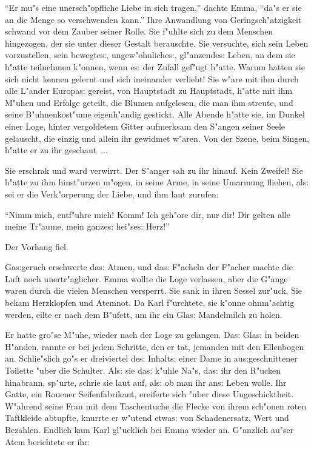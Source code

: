 \documentclass[oneside,12pt]{book}
\newcommand{\s}{s:}%
\begin{document}
"`Er mu"s eine unersch"opfliche Liebe in sich tragen,"' dachte
Emma, "`da"s er sie an die Menge so verschwenden kann."' Ihre
Anwandlung von Gering\-sch"atzigkeit schwand vor dem Zauber seiner
Rolle. Sie f"uhlte sich zu dem Menschen hingezogen, der sie unter
dieser Gestalt berauschte. Sie versuchte, sich sein Leben
vorzustellen, sein bewegte{\s}, ungew"ohnliche{\s}, gl"anzende{\s}
Leben, an dem sie h"atte teilnehmen k"onnen, wenn e{\s} der Zufall
gef"ugt h"atte. Warum hatten sie sich nicht kennen gelernt und
sich ineinander verliebt! Sie w"are mit ihm durch alle L"ander
Europa{\s} gereist, von Hauptstadt zu Hauptstadt, h"atte mit ihm
M"uhen und Erfolge geteilt, die Blumen aufgelesen, die man ihm
streute, und seine B"uhnenkost"ume eigenh"andig gestickt. Alle
Abende h"atte sie, im Dunkel einer Loge, hinter vergoldetem Gitter
aufmerksam den S"angen seiner Seele gelauscht, die einzig und
allein ihr gewidmet w"aren. Von der Szene, beim Singen, h"atte er
zu ihr geschaut~...

Sie erschrak und ward verwirrt. Der S"anger sah zu ihr hinauf.
Kein Zweifel! Sie h"atte zu ihm hinst"urzen m"ogen, in seine Arme,
in seine Umarmung fliehen, al{\s} sei er die Verk"orperung der
Liebe, und ihm laut zurufen:

"`Nimm mich, entf"uhre mich! Komm! Ich geh"ore dir, nur dir! Dir
gelten alle meine Tr"aume, mein ganze{\s} hei"se{\s} Herz!"'

Der Vorhang fiel.

Ga{\s}geruch erschwerte da{\s} Atmen, und da{\s} F"acheln der
F"acher machte die Luft noch unertr"aglicher. Emma wollte die Loge
verlassen, aber die G"ange waren durch die vielen Menschen
versperrt. Sie sank in ihren Sessel zur"uck. Sie bekam Herzklopfen
und Atemnot. Da Karl f"urchtete, sie k"onne ohnm"achtig werden,
eilte er nach dem B"ufett, um ihr ein Gla{\s} Mandelmilch zu
holen.

Er hatte gro"se M"uhe, wieder nach der Loge zu gelangen. Da{\s}
Gla{\s} in beiden H"anden, rannte er bei jedem Schritte, den er
tat, jemanden mit den Ellenbogen an. Schlie"slich go"s er
dreiviertel de{\s} Inhalt{\s} einer Dame in au{\s}geschnittener
Toilette "uber die Schulter. Al{\s} sie da{\s} k"uhle Na"s, da{\s}
ihr den R"ucken hinabrann, sp"urte, schrie sie laut auf, al{\s} ob
man ihr an{\s} Leben wolle. Ihr Gatte, ein Rouener
Seifenfabrikant, ereiferte sich "uber diese Ungeschicktheit.
W"ahrend seine Frau mit dem Taschentuche die Flecke von ihrem
sch"onen roten Taftkleide abtupfte, knurrte er w"utend etwa{\s}
von Schadenersatz, Wert und Bezahlen. Endlich kam Karl gl"ucklich
bei Emma wieder an. G"anzlich au"ser Atem berichtete er ihr:
\end{document}
